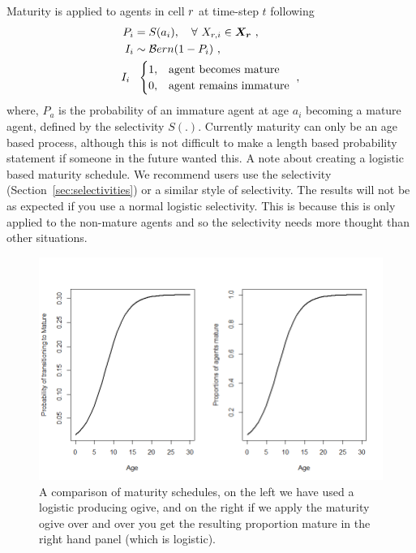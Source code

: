 Maturity is applied to agents in cell \(r\) at time-step \(t\) following
\begin{align*}
P_i &= S(a_i), \quad \forall \  X_{\regnd,i} \in \bm{X_\regnd} \ ,\\
I_i &\sim\distbern(1 - P_i) \ ,\\
I_i \ & \ 
\begin{cases}
1,& \text{agent becomes mature}\\
0,& \text{agent remains immature}
\end{cases} \ ,
\end{align*}
where, $P_a$ is the probability of an immature agent at age $a_i$ becoming a mature agent, defined by the selectivity \(S(.)\). Currently maturity can only be an age based process, although this is not difficult to make a length based probability statement if someone in the future wanted this. A note about creating a logistic based maturity schedule. We recommend users use the selectivity  (Section~\ref{sec:selectivities}) or a similar style of selectivity. The results will not be as expected if you use a normal logistic selectivity. This is because this is only applied to the non-mature agents and so the selectivity needs more thought than other situations.\\

\begin{figure}[htp]\label{fig:mature}
	\centering
	\includegraphics[scale=0.6]{Figures/maturity_ogives.png}%
	\caption{A comparison of maturity schedules, on the left we have used a logistic producing ogive, and on the right if we apply the maturity ogive over and over you get the resulting proportion mature in the right hand panel (which is logistic).}
\end{figure}


